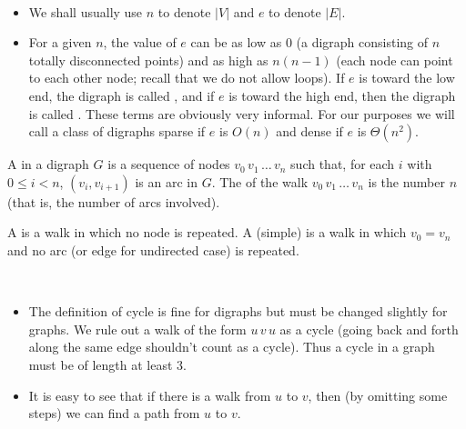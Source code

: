 \begin{note} 
\

\begin{itemize}
\item
We shall usually use $n$ to denote $|V|$ and $e$ to denote
$|E|$.
\item
For a given $n$, the value of $e$ can be as low as $0$ (a digraph
consisting of $n$ totally disconnected points)  and as high as $n(n-1)$
(each node can point to each other node; recall that we do not allow
loops). If $e$ is toward the low end, the digraph is called , and 
if $e$ is toward the high end, then the digraph is called . These
terms are obviously very informal. For our purposes we will call a class of 
digraphs sparse if $e$ is $O(n)$ and dense if $e$ is $\Theta(n^2)$.
\end{itemize}
\end{note}

\begin{Definition} 
A  in a digraph $G$ is a sequence of nodes $v_0\, v_1\,
\ldots\, v_n$ such that, for each $i$ with $0 \leq i < n$, $(v_i,
v_{i+1})$ is an arc in $G$. The  of the walk $v_0\, v_1\,
\ldots \,v_n$ is the number $n$ (that is, the number of arcs involved).

A  is a walk in which no node is repeated. A (simple)  
is a walk in which $v_0 = v_n$ and no arc (or edge for undirected case) 
is repeated. 
\end{Definition}

\begin{note}
\

\begin{itemize}
\item The definition of cycle is fine for digraphs but must be changed
slightly for graphs. We rule out a walk of the form $u\, v\, u$ as a
cycle (going back and forth along the same edge shouldn't count as a
cycle). Thus a cycle in a graph must be of length at least $3$.
\item It is easy to see that if there is a walk from $u$ to $v$, then
(by omitting some steps) we can find a path from $u$ to $v$.
\end{itemize}
\end{note}

